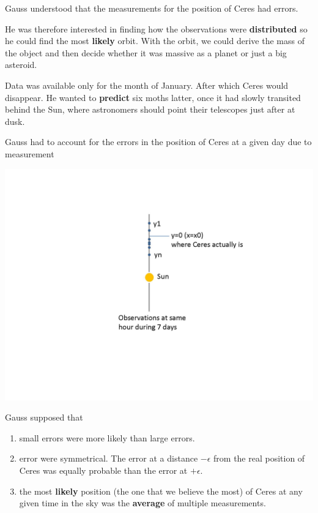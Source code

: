 \documentclass[
]{book}
\begin{document}
Gauss understood that the measurements for the position of Ceres had errors.

He was therefore interested in finding how the observations were \textbf{distributed} so he could find the most \textbf{likely} orbit. With the orbit, we could derive the mass of the object and then decide whether it was massive as a planet or just a big asteroid.

Data was available only for the month of January. After which Ceres would disappear. He wanted to \textbf{predict} six moths latter, once it had slowly transited behind the Sun, where astronomers should point their telescopes just after at dusk.

Gauss had to account for the errors in the position of Ceres at a given day due to measurement

\includegraphics{./figures/ceres.JPG}

Gauss supposed that

\begin{enumerate}
\def\labelenumi{\arabic{enumi})}
\item
  small errors were more likely than large errors.
\item
  error were symmetrical. The error at a distance \(-\epsilon\) from the real position of Ceres was equally probable than the error at \(+\epsilon\).
\item
  the most \textbf{likely} position (the one that we believe the most) of Ceres at any given time in the sky was the \textbf{average} of multiple measurements.
\end{enumerate}
\end{document}
